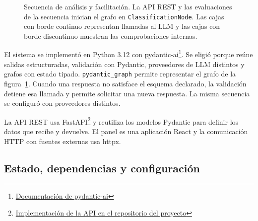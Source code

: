 \begin{figure}[htbp]
\caption{Secuencia de análisis y facilitación. La API REST y las evaluaciones de la secuencia inician el grafo en \texttt{ClassificationNode}. Las cajas con borde continuo representan llamadas al LLM y las cajas con borde discontinuo muestran las comprobaciones internas.}
\label{fig:pipeline}
\end{figure}

El sistema se implementó en Python 3.12 con pydantic-ai\footnote{\href{https://ai.pydantic.dev/}{Documentación de pydantic-ai}}. Se eligió porque reúne salidas estructuradas, validación con Pydantic, proveedores de LLM distintos y grafos con estado tipado. \texttt{pydantic\_graph} permite representar el grafo de la figura~\ref{fig:pipeline}. Cuando una respuesta no satisface el esquema declarado, la validación detiene esa llamada y permite solicitar una nueva respuesta. La misma secuencia se configuró con proveedores distintos.

La API REST usa FastAPI\footnote{\href{https://github.com/magrimal/tfm-2026-discussion-moderation}{Implementación de la API en el repositorio del proyecto}} y reutiliza los modelos Pydantic para definir los datos que recibe y devuelve. El panel es una aplicación React y la comunicación HTTP con fuentes externas usa httpx.

\subsection{Estado, dependencias y configuración}

